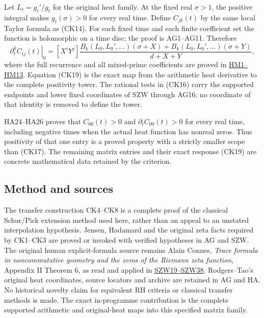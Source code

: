 \documentclass[
  10pt,
  a4paper,
]{article}
\begin{document}
Let \(L_t=g_t'/g_t\) for the original heat family. At the fixed real
\(\sigma>1\), the positive integral makes \(g_t(\sigma)>0\) for every
real time. Define \(C_{jk}(t)\) by the same local Taylor formula as
(CK14). For each fixed time and each finite coefficient set the function
is holomorphic on a time disc; the proof is AG1--AG11. Therefore \[
\left.\partial_t^k C_{ij}(t)\right|_0
=[X^iY^j]\frac{B_k(L_0,L_0',\ldots)(\sigma+X)
+B_k(L_0,L_0',\ldots)(\sigma+Y)}{d+X+Y},
\tag{CK19}
\] where the full recurrence and all mixed-prime coefficients are proved
in \href{HEAT_MIXED_PRIME_RECURRENCE.md}{HM1--HM13}. Equation (CK19) is
the exact map from the arithmetic heat derivative to the complete
positivity tower. The rational tests in (CK16) carry the supported
endpoints and lower fixed coordinates of SZW through AG16; no coordinate
of that identity is removed to define the tower.

HA24--HA26 proves that \(C_{00}(t)>0\) and \(\partial_tC_{00}(t)>0\) for
every real time, including negative times when the actual heat function
has nonreal zeros. Thus positivity of that one entry is a proved
property with a strictly smaller scope than (CK17). The remaining matrix
entries and their exact response (CK19) are concrete mathematical data
retained by the criterion.

\subsection{Method and sources}\label{method-and-sources}

The transfer construction CK4--CK8 is a complete proof of the classical
Schur/Pick extension method used here, rather than an appeal to an
unstated interpolation hypothesis. Jensen, Hadamard and the original
zeta facts required by CK1--CK3 are proved or invoked with verified
hypotheses in AG and SZW. The original human explicit-formula source
remains Alain Connes, \emph{Trace formula in noncommutative geometry and
the zeros of the Riemann zeta function}, Appendix II Theorem 6, as read
and applied in
\href{https://github.com/KokunoYumeto/zeta-function-research-reader/blob/3c022a0adde0a6aa3d8fc8e43ef42795d88e44b0/workbenches/splitzero-tandem/branches/tau-zero-prime-positivity/SUPPORTED_ZERO_PRIME_WEIL_DERIVATION.md}{SZW19--SZW38}.
Rodgers--Tao's original heat coordinates, source locators and archive
are retained in AG and HA. No historical novelty claim for equivalent RH
criteria or classical transfer methods is made. The exact in-programme
contribution is the complete supported arithmetic and original-heat maps
into this specified matrix family.
\end{document}
